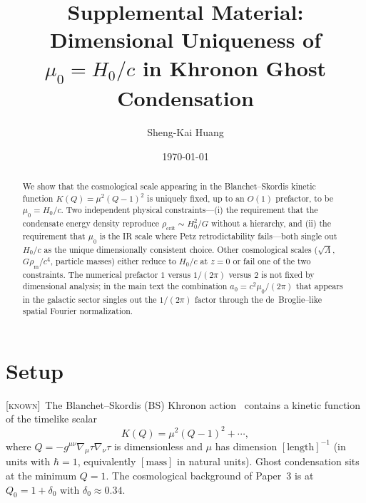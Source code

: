 \documentclass[prd,twocolumn,superscriptaddress,longbibliography,floatfix]{revtex4-2}
\newcommand{\Hzero}{H_{0}}
\newcommand{\muzero}{\mu_{0}}
\newcommand{\rhocrit}{\rho_{\mathrm{crit}}}
\newcommand{\known}{\textsc{[known]}}
\begin{document}
\title{Supplemental Material: Dimensional Uniqueness of\\
$\muzero = \Hzero/c$ in Khronon Ghost Condensation}

\author{Sheng-Kai Huang}

\date{\today}

\begin{abstract}
We show that the cosmological scale appearing in the
Blanchet--Skordis kinetic function $K(Q) = \mu^{2}(Q-1)^{2}$
is uniquely fixed, up to an $O(1)$ prefactor, to be
$\muzero = \Hzero/c$.  Two independent physical
constraints---(i) the requirement that the condensate
energy density reproduce $\rhocrit \sim \Hzero^{2}/G$
without a hierarchy, and (ii) the requirement that
$\muzero$ is the IR scale where Petz retrodictability
fails---both single out $\Hzero/c$ as the unique
dimensionally consistent choice.  Other cosmological
scales ($\sqrt{\Lambda}$, $G\rho_{\mathrm{m}}/c^{4}$,
particle masses) either reduce to $\Hzero/c$ at $z = 0$
or fail one of the two constraints.  The numerical
prefactor $1$ versus $1/(2\pi)$ versus $2$ is not fixed
by dimensional analysis; in the main text the
combination $a_{0} = c^{2}\muzero/(2\pi)$ that appears
in the galactic sector singles out the $1/(2\pi)$
factor through the de~Broglie--like spatial Fourier
normalization.
\end{abstract}

\maketitle

\section{Setup}
\label{sec:setup}

\known\ The Blanchet--Skordis (BS) Khronon
action~\cite{BS2024,BS2025} contains a kinetic function
of the timelike scalar
\begin{equation}
K(Q) = \mu^{2}(Q-1)^{2} + \cdots,
\label{eq:KQ}
\end{equation}
where $Q = -g^{\mu\nu}\nabla_{\mu}\tau\nabla_{\nu}\tau$
is dimensionless and $\mu$ has dimension $[\mathrm{length}]^{-1}$
(in units with $\hbar = 1$, equivalently
$[\mathrm{mass}]$ in natural units).  Ghost condensation
sits at the minimum $Q = 1$.  The cosmological background
of Paper~3 is at $Q_{0} = 1 + \delta_{0}$ with
$\delta_{0} \approx 0.34$.
\end{document}
